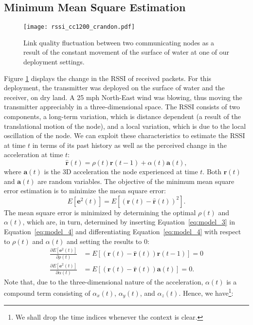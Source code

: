\subsection{Minimum Mean Square Estimation}
\label{sec:mmse}

\begin{figure}
	\centering
	\texttt{[image: rssi\_cc1200\_crandon.pdf]}
	\caption{Link quality fluctuation between two communicating nodes as a result of the constant movement of the surface of water at one of our deployment settings. }
	\label{fig:crssi_cc1200}
\end{figure}

Figure \ref{fig:crssi_cc1200} displays the change in the RSSI of received packets. For this  deployment, the transmitter was deployed on the surface of water and the receiver, on dry land. A 25 mph North-East wind was blowing, thus moving the transmitter appreciably in a three-dimensional space. The RSSI consists of two components, a long-term variation, which is distance dependent (a result of the translational motion of the node), and a local variation, which is due to the local oscillation of the node. We can exploit these characteristics to estimate the RSSI at time $t$ in terms of its past history as well as the perceived change in the acceleration at time $t$: 
\begin{equation}
\label{eq:model_3}
    \hat{ \mathbf{r}}(t) =  \rho (t) \mathbf{r} (t-1) + \alpha (t) \mathbf{a} (t),
\end{equation}
where $\mathbf{a}(t)$ is the 3D acceleration the node experienced at time $t$. Both $\mathbf{r}(t)$ and $\mathbf{a}(t)$ are random variables. The objective of the minimum mean square error estimation is to minimize the  mean square error:%
\begin{equation}
\label{eq:model_4}
E \left [ \mathbf{e}^2(t) \right ] = E \left [ \left (\mathbf{r} (t) - \hat{\mathbf{r}}(t) \right )^2 \right ].
\end{equation}
The mean square error is minimized by determining the optimal $\rho(t)$ and $\alpha(t)$, which are, in turn, determined by inserting Equation~\ref{eq:model_3} in Equation~\ref{eq:model_4} and differentiating Equation~\ref{eq:model_4} with respect to $\rho(t)$ and $\alpha(t)$ and setting the results to 0:
\begin{align}
\label{eq:model_4_orthogonal}
\frac{\partial E \left [ \mathbf{e}^2(t)\right]}{\partial \rho(t)} & =   E \left [ \left ( \mathbf{r}(t) - \hat{\mathbf{r}}(t) \right ) \mathbf{r}(t-1) \right]  = 0 \\ \nonumber 
\frac{\partial E \left [ \mathbf{e}^2(t)\right]}{ \partial \alpha(t)} & =   E \left [ \left ( \mathbf{r}(t) - \hat{\mathbf{r}}(t) \right ) \mathbf{a}(t) \right]  = 0.  \nonumber 
\end{align}
Note that, due to the three-dimensional nature of the acceleration, $\alpha(t)$ is a compound term consisting of $\alpha_x(t)$,  $\alpha_y(t)$, and  $\alpha_z(t)$. Hence, we have\footnote{We shall drop the time indices whenever the context is clear.}:

